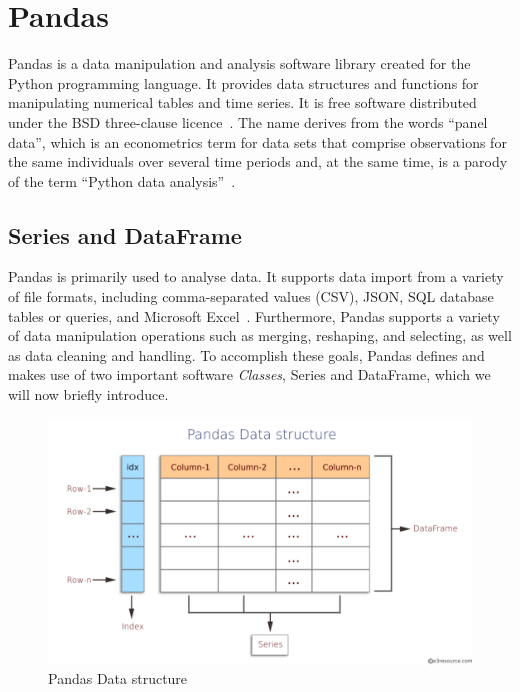 \section{Pandas}\label{section:pandas}
Pandas is a data manipulation and analysis software library created for the Python programming language. It provides data structures and functions for manipulating numerical tables and time series. It is free software distributed under the BSD three-clause licence~\cite{Misc:OpenLDAP_license:oldap-2.7}.
The name derives from the words ``panel data'', which is an econometrics term for data sets that comprise observations for the same individuals over several time periods and, at the same time, is a parody of the term ``Python data analysis''~\cite{mckinney_data_2010}.

\subsection{Series and DataFrame}
Pandas is primarily used to analyse data. It supports data import from a variety of file formats, including comma-separated values (CSV), JSON, SQL database tables or queries, and Microsoft Excel~\cite{Misc:pandas_docs}.
Furthermore, Pandas supports a variety of data manipulation operations such as merging, reshaping, and selecting, as well as data cleaning and handling.
To accomplish these goals, Pandas defines and makes use of two important software \textit{Classes}, Series and DataFrame, which we will now briefly introduce.
\begin{figure}[ht]
    \centering
    \includegraphics[width=\textwidth]{content/chapter_3/images/datastructure.pdf}
    \caption{Pandas Data structure}
    \label{fig:pandas_dataframe}
\end{figure}

